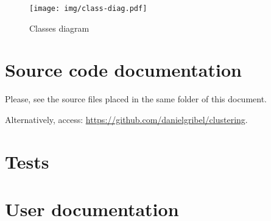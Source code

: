 \documentclass[10pt]{article}
\begin{document}
\begin{figure}[!htbp]
	\centering
	\texttt{[image: img/class-diag.pdf]}
	\caption{Classes diagram}
	\label{fig:class-diag}
\end{figure}

\section{Source code documentation}
Please, see the source files placed in the same folder of this document.

\noindent Alternatively, access: \url{https://github.com/danielgribel/clustering}.

\section{Tests}

\section{User documentation}
\end{document}
